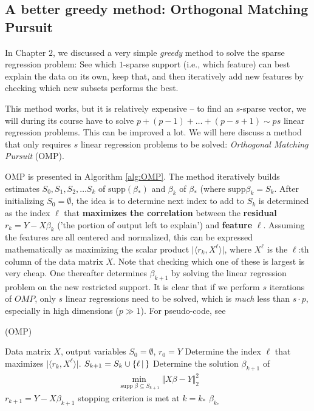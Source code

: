 \documentclass{article}
\DeclareMathOperator{\supp}{\mathrm{supp}}
\newcommand{\sprod}[1]{\langle #1 \rangle}
\newcommand{\sse}{\subseteq}
\newcommand{\set}[2]{\{ #1 \, \vert \, #2\}}
\newcommand{\abs}[1]{\vert #1 \vert}
\newcommand{\norm}[1]{\Vert #1 \Vert}
\begin{document}
\subsection{A better greedy method: Orthogonal Matching Pursuit}
In Chapter $2$, we discussed a very simple \emph{greedy} method to solve the sparse regression problem: See which $1$-sparse support (i.e., which feature) can best explain the data on its own, keep that, and then iteratively add new features by checking which new subsets performs the best.

This method works, but it is relatively expensive -- to find an $s$-sparse vector, we will during its course have to solve $p+(p-1)+\dots + (p-s+1) \sim ps$ linear regression problems. This can be improved a lot. We will here discuss a method that only requires $s$ linear regression problems to be solved: \emph{Orthogonal Matching Pursuit} (OMP).


OMP is presented in Algorithm \ref{alg:OMP}. The method iteratively builds estimates $S_0,S_1,S_2, \dots S_k$ of $\mathrm{supp}(\beta_*)$ and $\beta_k$ of $\beta_*$ (where $\mathrm{supp} \beta_k = S_k$. After initializing $S_0=\emptyset$, the idea is to determine next index to add to $S_k$ is determined as the index $\ell$ that \textbf{maximizes the correlation} between the \textbf{residual} $r_k=Y-X\beta_k$ ('the portion of output left to explain') and \textbf{feature} $\ell$. Assuming the features are all centered and normalized, this can be expressed mathematically as maximizing the scalar product $\abs{\sprod{r_k,X^\ell}}$, where $X^\ell$ is the $\ell$:th column of the data matrix $X$. Note that checking which one of these is largest is very cheap. One thereafter determines $\beta_{k+1}$ by solving the linear regression problem on the new restricted support. It is clear that if we perform $s$ iterations of $OMP$, only $s$ linear regressions need to be solved, which is \emph{much} less than $s\cdot p$, especially in high dimensions ($p\gg 1$). For pseudo-code, see 


\begin{algorithm}[tb]      
	\caption{(OMP)} 
	\label{alg:OMP}
	\begin{algorithmic} [1]
 		\REQUIRE Data matrix $X$,  output variables
 		\STATE $S_0=\emptyset$, $r_0 = Y$
 		\REPEAT
 			\STATE Determine the index $\ell$ that maximizes $\abs{\sprod{r_k, X^\ell}}$.
            \STATE $S_{k+1} = S_k \cup \set{\ell}$
            \STATE Determine the solution $\beta_{k+1}$ of 
            \begin{align}
                \min_{\supp \beta \sse S_{k+1}} \norm{X\beta - Y}_2^2 \label{eq:ompprob}
            \end{align}
            \STATE $r_{k+1} = Y-X\beta_{k+1}$
 		\UNTIL stopping criterion is met at $k= k_*$
 		\RETURN $\beta_{k_*}$
	\end{algorithmic}
\end{algorithm}
\end{document}
